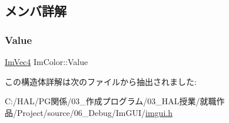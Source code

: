 \subsection{メンバ詳解}
\mbox{\label{struct_im_color_a4cf43bd58e30decaa0248f839fc85e95}} 
\subsubsection{\texorpdfstring{Value}{Value}}
{\footnotesize\ttfamily \mbox{\hyperlink{struct_im_vec4}{Im\+Vec4}} Im\+Color\+::\+Value}



この構造体詳解は次のファイルから抽出されました\+:\begin{DoxyCompactItemize}
\item 
C\+:/\+H\+A\+L/\+P\+G関係/03\+\_\+作成プログラム/03\+\_\+\+H\+A\+L授業/就職作品/\+Project/source/06\+\_\+\+Debug/\+Im\+G\+U\+I/\mbox{\hyperlink{imgui_8h}{imgui.\+h}}\end{DoxyCompactItemize}
